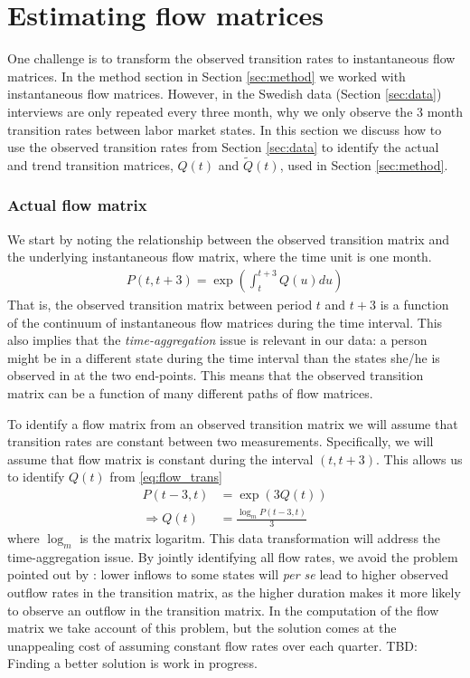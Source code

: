 \section{Estimating flow matrices}
\label{sec:est_flow_matrices}

One challenge is to transform the observed transition rates to instantaneous flow matrices. In the method section in Section \ref{sec:method} we worked with instantaneous flow matrices. However, in the Swedish data (Section \ref{sec:data}) interviews are only repeated every three month, why we only observe the 3 month transition rates between labor market states. In this section we discuss how to use the observed transition rates from Section \ref{sec:data} to identify the actual and trend transition matrices, $Q(t)$ and $\tilde{Q}(t)$, used in Section \ref{sec:method}.

\subsubsection{Actual flow matrix}

We start by noting the relationship between the observed transition matrix and the underlying instantaneous flow matrix, where the time unit is one month.
\begin{align}
P(t,t+3)=\exp \left( \int_{t}^{t+3} Q(u) du \right) \label{eq:flow_trans}
\end{align}
That is, the observed transition matrix between period $t$ and $t+3$ is a function of the continuum of instantaneous flow matrices during the time interval. This also implies that the \emph{time-aggregation} issue is relevant in our data: a person might be in a different state during the time interval than the states she/he is observed in at the two end-points. This means that the observed transition matrix can be a function of many different paths of flow matrices.

To identify a flow matrix from an observed transition matrix we will assume that transition rates are constant between two measurements. Specifically, we will assume that flow matrix is constant during the interval $(t,t+3)$. This allows us to identify $Q(t)$ from \eqref{eq:flow_trans}
\begin{align}
	P(t-3,t)&=\exp \left( 3 Q(t) \right) \\
	\Rightarrow Q(t)&=\frac{\log_m P(t-3,t)}{3}
\end{align}
where $\log_m$ is the matrix logaritm. This data transformation will address the time-aggregation issue. By jointly identifying all flow rates, we avoid the problem pointed out by \cite{Shimer2012}: lower inflows to some states will \emph{per se} lead to higher observed outflow rates in the transition matrix, as the higher duration makes it more likely to observe an outflow in the transition matrix. In the computation of the flow matrix we take account of this problem, but the solution comes at the unappealing cost of assuming constant flow rates over each quarter. TBD: Finding a better solution is work in progress.


